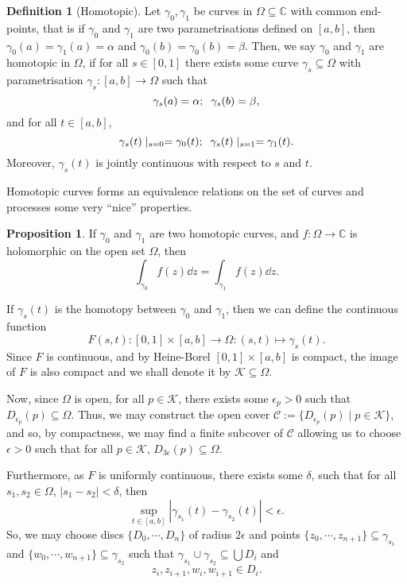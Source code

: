 \documentclass[
]{article}
\theoremstyle{definition}
\newtheorem{prop}{Proposition}
\theoremstyle{definition}
\newtheorem{definition}{Definition}[section]
\begin{document}
\begin{definition}[Homotopic]
  Let \(\gamma_0, \gamma_1\) be curves in \(\Omega \subseteq \mathbb{C}\) with 
  common end-points, that is if \(\gamma_0\) and \(\gamma_1\) are two parametrisations 
  defined on \([a, b]\), then \(\gamma_0(a) = \gamma_1(a) = \alpha\) and 
  \(\gamma_0(b) = \gamma_0(b) = \beta\). Then, we say \(\gamma_0\) and \(\gamma_1\) are 
  homotopic in \(\Omega\), if for all \(s \in [0, 1]\) there exists some curve 
  \(\gamma_s \subseteq \Omega\) with parametrisation \(\gamma_s : [a, b] \to \Omega\) 
  such that 
  \[\gamma_s(a) = \alpha; \hspace{2mm} \gamma_s(b) = \beta,\]
  and for all \(t \in [a, b]\), 
  \[\gamma_s(t) \mid_{s = 0} = \gamma_0(t); \hspace{2mm} \gamma_s(t) \mid_{s = 1} = \gamma_1(t).\]
  Moreover, \(\gamma_s(t)\) is jointly continuous with respect to \(s\) and \(t\).
\end{definition}

Homotopic curves forms an equivalence relations on the set of curves and
processes some very ``nice'' properties.

\begin{prop}
  If \(\gamma_0\) and \(\gamma_1\) are two homotopic curves, and 
  \(f : \Omega \to \mathbb{C}\) is holomorphic on the open set \(\Omega\), then 
  \[\int_{\gamma_0} f(z) \dd z = \int_{\gamma_1} f(z) \dd z.\]
\end{prop}
\proof

If \(\gamma_s(t)\) is the homotopy between \(\gamma_0\) and
\(\gamma_1\), then we can define the continuous function
\[F(s, t) : [0, 1] \times [a, b] \to \Omega : (s, t) \mapsto \gamma_s(t).\]
Since \(F\) is continuous, and by Heine-Borel \([0, 1] \times [a, b]\)
is compact, the image of \(F\) is also compact and we shall denote it by
\(\mathcal{K} \subseteq \Omega\).

Now, since \(\Omega\) is open, for all \(p \in \mathcal{K}\), there
exists some \(\epsilon_p > 0\) such that
\(D_{\epsilon_p}(p) \subseteq \Omega\). Thus, we may construct the open
cover \(\mathcal{C} := \{D_{\epsilon_p}(p) \mid p \in \mathcal{K}\}\),
and so, by compactness, we may find a finite subcover of \(\mathcal{C}\)
allowing us to choose \(\epsilon > 0\) such that for all
\(p \in \mathcal{K}\), \(D_{3\epsilon}(p) \subseteq \Omega\).

Furthermore, as \(F\) is uniformly continuous, there exists some
\(\delta\), such that for all \(s_1, s_2 \in \Omega\),
\(|s_1 - s_2| < \delta\), then
\[\sup_{t \in [a, b]} |\gamma_{s_1}(t) - \gamma_{s_2}(t)| < \epsilon.\]
So, we may choose discs \(\{D_0, \cdots, D_n\}\) of radius \(2\epsilon\)
and points \(\{z_0, \cdots, z_{n + 1}\} \subseteq \gamma_{s_1}\) and
\(\{w_0, \cdots, w_{n + 1}\} \subseteq \gamma_{s_2}\) such that
\(\gamma_{s_1} \cup \gamma_{s_2} \subseteq \bigcup D_i\) and
\[z_i, z_{i + 1}, w_i, w_{i + 1} \in D_i.\]
\end{document}
